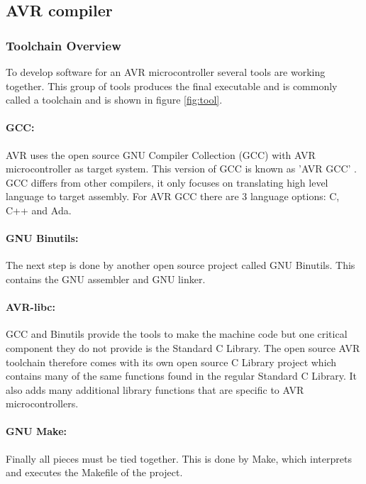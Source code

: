 \subsection{AVR compiler}
\subsubsection{Toolchain Overview}
To develop software for an AVR microcontroller several tools are working together. This group of tools produces the final executable and is commonly called a toolchain and is shown in figure \ref{fig:tool}. 
\paragraph{GCC:} AVR uses the open source GNU Compiler Collection (GCC) with AVR microcontroller as target system. This version of GCC is known as 'AVR GCC' . GCC differs from other compilers, it only focuses on translating high level language to target assembly. For AVR GCC there are 3 language options: C, C++ and Ada. 
\paragraph{GNU Binutils: }The next step is done by another open source project called GNU Binutils. This contains the GNU assembler and GNU linker.
\paragraph{AVR-libc:} GCC and Binutils provide the tools to make the machine code but one critical component they do not provide is the Standard C Library. The open source AVR toolchain therefore comes with its own open source C Library project which contains many of the same functions found in the regular Standard C Library. It also adds many additional library functions that are specific to  AVR microcontrollers.
\paragraph{GNU Make:} Finally all pieces must be tied together. This is done by Make, which interprets and executes the Makefile of the project.
